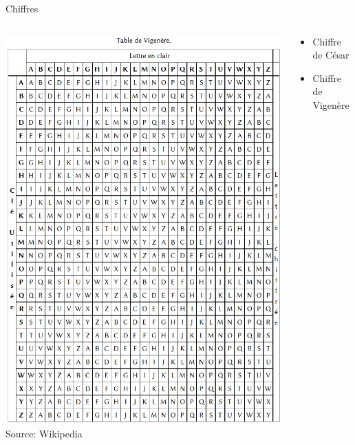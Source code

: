 \documentclass[12pt]{beamer}
\begin{document}
		\begin{frame}{Chiffres}
			\begin{columns}
				\begin{column}[c]{5cm}
					\includegraphics[scale=0.26]{table_vigenere.png}\\{\footnotesize Source: Wikipedia}
				\end{column}
				\begin{column}[c]{5cm}
					\begin{itemize}
						\item Chiffre de César
						\item Chiffre de Vigenère
					\end{itemize}
				\end{column}
			\end{columns}		
		\end{frame}
		
\end{document}
